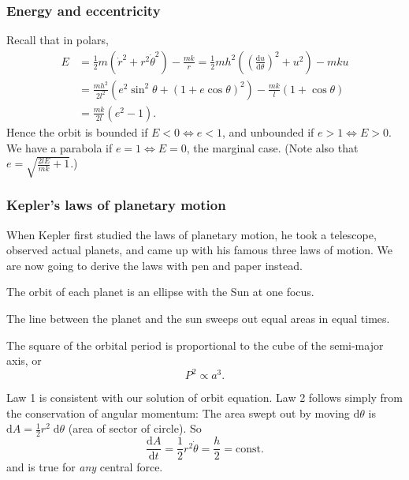 \subsubsection*{Energy and eccentricity}
Recall that in polars,
\begin{align*}
    E&=\frac{1}{2}m \left( \dot{r}^2+r^2 \dot{\theta}^2 \right) - \frac{mk}{r}=\frac{1}{2}mh^2\left( \left( \frac{\mathrm{d}u}{\mathrm{d}\theta} \right)^2+u^2  \right)-mku\\
    &= \frac{mh^2}{2l^2}\left( e^2 \sin ^2 \theta+(1+e \cos\theta)^2 \right)-\frac{mk}{l}(1+ \cos \theta)\\ 
    &= \frac{mk}{2l}(e^2-1).
\end{align*}
Hence the orbit is bounded if $ E<0 \Leftrightarrow e<1 $, and unbounded if $ e>1 \Leftrightarrow E>0 $. We have a parabola if $ e=1 \Leftrightarrow E=0 $, the marginal case. (Note also that $ e=\sqrt{\frac{2lE}{mk}+1}$.)

\subsubsection*{Kepler's laws of planetary motion}
When Kepler first studied the laws of planetary motion, he took a telescope, observed actual planets, and came up with his famous three laws of motion. We are now going to derive the laws with pen and paper instead.

\begin{law}
  The orbit of each planet is an ellipse with the Sun at one focus.
\end{law}

\begin{law}
  The line between the planet and the sun sweeps out equal areas in equal times.
\end{law}

\begin{law}
  The square of the orbital period is proportional to the cube of the semi-major axis, or
  \[
    P^2 \propto a^3.
  \]
\end{law}

Law 1 is consistent with our solution of orbit equation. Law 2 follows simply from the conservation of angular momentum: The area swept out by moving $\mathrm{d} \theta$ is $\mathrm{d} A = \frac{1}{2}r^2\;\mathrm{d} \theta$ (area of sector of circle). So
\[
  \frac{\mathrm{d} A}{\mathrm{d} t} = \frac{1}{2}r^2\dot{\theta} = \frac{h}{2} = \text{const}.
\]
and is true for \emph{any} central force.

